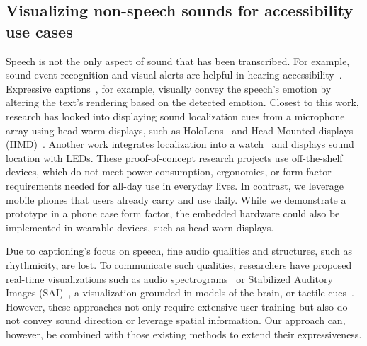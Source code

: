 
\subsection{Visualizing non-speech sounds for accessibility use cases}
Speech is not the only aspect of sound that has been transcribed. For example, sound event recognition and visual alerts are helpful in hearing accessibility~\cite{sound_awareness, HomeSound, sound_detector_app,dhruv_sound_events}. Expressive captions~\cite{expressive_captions}, for example, visually convey the speech's emotion by altering the text's rendering based on the detected emotion. Closest to this work, research has looked into displaying sound localization cues from a microphone array using head-worm displays, such as HoloLens~\cite{holo_sound} and Head-Mounted displays (HMD)~\cite{dhruv_google_glass_localization}. Another work integrates localization into a watch~\cite{kaneko2013light} and displays sound location with LEDs. These proof-of-concept research projects use off-the-shelf devices, which do not meet power consumption, ergonomics, or form factor requirements needed for all-day use in everyday lives. In contrast, we leverage mobile phones that users already carry and use daily. While we demonstrate a prototype in a phone case form factor, the embedded hardware could also be implemented in wearable devices, such as head-worn displays. 

Due to captioning's focus on speech, fine audio qualities and structures, such as rhythmicity, are lost. To communicate such qualities, researchers have proposed real-time visualizations such as audio spectrograms~\cite{greene1984recognition} or Stabilized Auditory Images (SAI)~\cite{lyon2017human}, a visualization grounded in models of the brain, or tactile cues~\cite{vhp}. However, these approaches not only require extensive user training but also do not convey sound direction or leverage spatial information. Our approach can, however, be combined with those existing methods to extend their expressiveness. 

